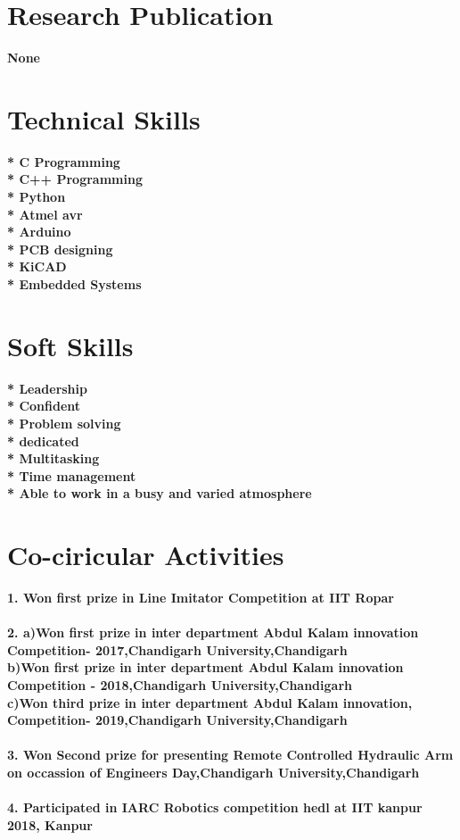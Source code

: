 \documentclass[11pt]{article}
\begin{document}
\section{Research Publication}
\textbf{None}

\section{Technical Skills}
\textbf{* C Programming}\\
\textbf{* C++ Programming}\\
\textbf{* Python}\\
\textbf{* Atmel avr}\\
\textbf{* Arduino}\\
\textbf{* PCB designing}\\
\textbf{* KiCAD}\\
\textbf{* Embedded Systems}\\

\section{Soft Skills}
\textbf{* Leadership}\\
\textbf{* Confident}\\
\textbf{* Problem solving}\\
\textbf{* dedicated}\\
\textbf{* Multitasking}\\
\textbf{* Time management}\\
\textbf{* Able to work in a busy and varied atmosphere }\\

\section{Co-ciricular Activities}
\textbf{1. Won first prize in Line Imitator Competition at IIT Ropar}\\\\
\textbf{2. a)Won first prize in inter department Abdul Kalam innovation Competition- 2017,Chandigarh University,Chandigarh }\\
\textbf{ b)Won first prize in inter department Abdul Kalam innovation Competition - 2018,Chandigarh University,Chandigarh }\\
\textbf{ c)Won third prize in inter department Abdul Kalam innovation, Competition- 2019,Chandigarh University,Chandigarh }\\\\
\textbf{3. Won Second prize for presenting Remote Controlled Hydraulic Arm on occassion of Engineers Day,Chandigarh University,Chandigarh }\\\\
\textbf{4. Participated in IARC Robotics competition hedl at IIT kanpur 2018, Kanpur} \\\\
\end{document}
